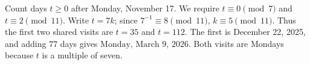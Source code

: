 Count days $t\ge0$ after Monday, November 17. We require $t\equiv0\pmod7$ and $t\equiv2\pmod{11}$. Write $t=7k$; since $7^{-1}\equiv8\pmod{11}$, $k\equiv5\pmod{11}$. Thus the first two shared visits are $t=35$ and $t=112$. The first is December 22, 2025, and adding $77$ days gives $\boxed{\text{Monday, March 9, 2026}}$. Both visits are Mondays because $t$ is a multiple of seven.
